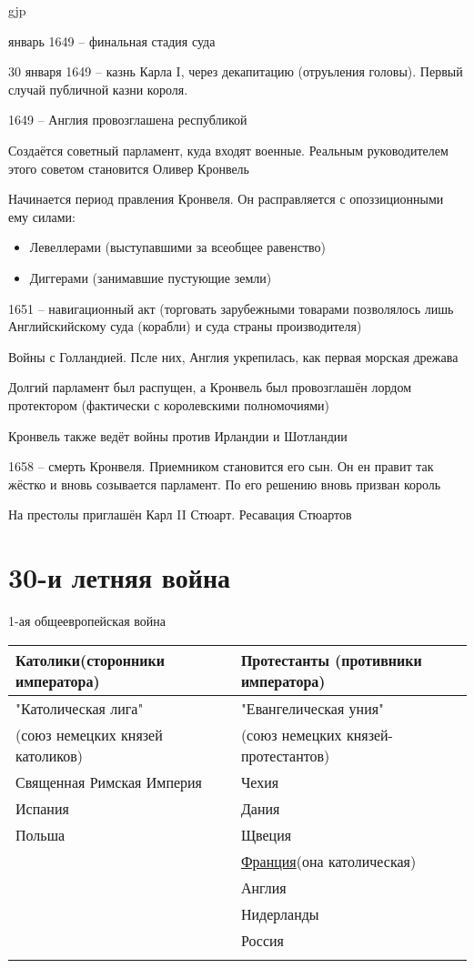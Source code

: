 gjp	 \documentclass[12pt,a4paper]{article}
\begin{document}
\begin{enumerate}
	январь 1649 -- финальная стадия суда
	
	30 января 1649 -- казнь Карла I, через декапитацию (отруьления головы). Первый случай публичной казни короля.
	
	1649 -- Англия провозглашена республикой
	
	Создаётся советный парламент, куда входят военные. Реальным руководителем этого советом становится Оливер Кронвель
	
	Начинается период правления Кронвеля. Он расправляется с опоззиционными ему силами:
	\begin{itemize}
		\item Левеллерами (выступавшими за всеобщее равенство)
		\item Диггерами (занимавшие пустующие земли)
	\end{itemize}
	
	1651 -- навигационный акт (торговать зарубежными товарами позволялось лишь Английскийскому суда (корабли) и суда страны производителя) 
	
	Войны с Голландией. Псле них, Англия укрепилась, как первая морская дрежава
	
	Долгий парламент был распущен, а Кронвель был провозглашён лордом протектором (фактически с королевскими полномочиями)
	
	Кронвель также ведёт войны против Ирландии и Шотландии
	
	1658 -- смерть Кронвеля. Приемником становится его сын. Он ен правит так жёстко и вновь созывается парламент. По его решению вновь призван король
	
	На престолы приглашён Карл II Стюарт. Ресавация Стюартов
	
\end{enumerate} 

\section{30-и летняя война}

1-ая общеевропейская война

\begin{tabular}{|l||l|}
\hline
Католики(сторонники императора) & Протестанты (противники императора)\\
\hline 
"Католическая лига" & "Евангелическая уния"\\
(союз немецких князей католиков) & (союз немецких князей-протестантов)\\
Священная Римская Империя & Чехия\\
Испания & Дания\\
Польша & Щвеция\\
 & \underline{Франция}(она католическая)\\
 & Англия\\
 & Нидерланды\\
 & Россия\\
 & \\
\hline
\end{tabular}
\end{document}
